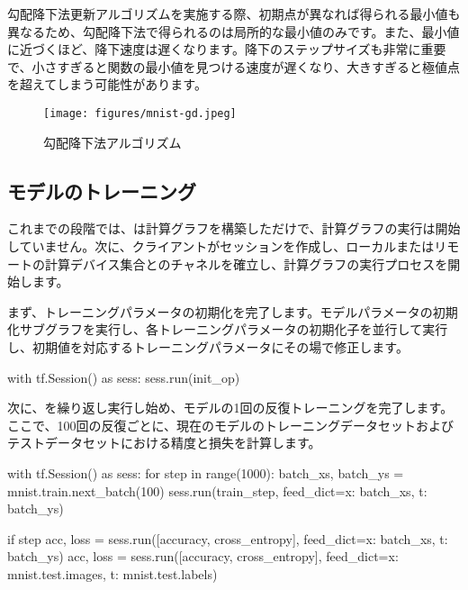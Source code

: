 \begin{content}
\begin{content}
勾配降下法更新アルゴリズムを実施する際、初期点が異なれば得られる最小値も異なるため、勾配降下法で得られるのは局所的な最小値のみです。また、最小値に近づくほど、降下速度は遅くなります。降下のステップサイズも非常に重要で、小さすぎると関数の最小値を見つける速度が遅くなり、大きすぎると極値点を超えてしまう可能性があります。

\begin{figure}[H]
\centering
\texttt{[image: figures/mnist-gd.jpeg]}
\caption{勾配降下法アルゴリズム}
 \label{fig:mnist-gd}
\end{figure}

\subsection{モデルのトレーニング}

これまでの段階では、\tf{}は計算グラフを構築しただけで、計算グラフの実行は開始していません。次に、クライアントがセッションを作成し、ローカルまたはリモートの計算デバイス集合とのチャネルを確立し、計算グラフの実行プロセスを開始します。

まず、トレーニングパラメータの初期化を完了します。モデルパラメータの初期化サブグラフを実行し、各トレーニングパラメータの初期化子を並行して実行し、初期値を対応するトレーニングパラメータにその場で修正します。

\begin{leftbar}
\begin{python}
with tf.Session() as sess:
  sess.run(init_op)
\end{python}
\end{leftbar}

次に、を繰り返し実行し始め、モデルの1回の反復トレーニングを完了します。ここで、100回の反復ごとに、現在のモデルのトレーニングデータセットおよびテストデータセットにおける精度と損失を計算します。

\begin{leftbar}
\begin{python}
with tf.Session() as sess:
  for step in range(1000):
    batch_xs, batch_ys = mnist.train.next_batch(100)        
    sess.run(train_step, feed_dict={x: batch_xs, t: batch_ys})
    
    if step %
      acc, loss = sess.run([accuracy, cross_entropy], 
        feed_dict={x: batch_xs, t: batch_ys})
      acc, loss = sess.run([accuracy, cross_entropy], 
        feed_dict={x: mnist.test.images, t: mnist.test.labels}) 
\end{python}
\end{leftbar}


\end{content}
\end{content}
